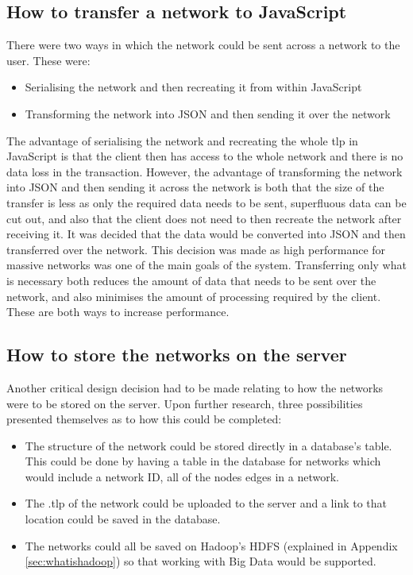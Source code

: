 \documentclass[../dissertation.tex]{subfiles}
\begin{document}
\subsection{How to transfer a network to JavaScript}

There were two ways in which the network could be sent across a network to the user. These were:

\begin{itemize}
    \item Serialising the network and then recreating it from within JavaScript
    \item Transforming the network into JSON and then sending it over the network
\end{itemize}

The advantage of serialising the network and recreating the whole tlp in JavaScript is that the client then has access to the whole network and there is no data loss in the transaction. However, the advantage of transforming the network into JSON and then sending it across the network is both that the size of the transfer is less as only the required data needs to be sent, superfluous data can be cut out, and also that the client does not need to then recreate the network after receiving it. It was decided that the data would be converted into JSON and then transferred over the network. This decision was made as high performance for massive networks was one of the main goals of the system. Transferring only what is necessary both reduces the amount of data that needs to be sent over the network, and also minimises the amount of processing required by the client. These are both ways to increase performance.

\subsection{How to store the networks on the server}

Another critical design decision had to be made relating to how the networks were to be stored on the server. Upon further research, three possibilities presented themselves as to how this could be completed:

\begin{itemize}
    \item The structure of the network could be stored directly in a database's table. This could be done by having a table in the database for networks which would include a network ID, all of the nodes edges in a network.
    \item The .tlp of the network could be uploaded to the server and a link to that location could be saved in the database.
    \item The networks could all be saved on Hadoop's HDFS (explained in Appendix \ref{sec:whatishadoop}) so that working with Big Data would be supported.
\end{itemize}
\end{document}
